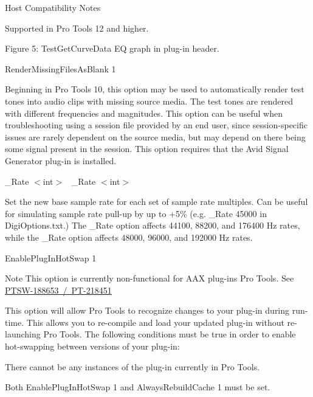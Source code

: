 \begin{DoxyItemize}
\begin{DoxyRefDesc}{Host Compatibility Notes}
\item[\mbox{\hyperlink{a00786__compatibility_notes000017}{Host Compatibility Notes}}]Supported in Pro Tools 12 and higher.\end{DoxyRefDesc}


  Figure 5\+: Test\+Get\+Curve\+Data EQ graph in plug-\/in header.


\item  {\ttfamily Render\+Missing\+Files\+As\+Blank 1}

Beginning in Pro Tools 10, this option may be used to automatically render test tones into audio clips with missing source media. The test tones are rendered with different frequencies and magnitudes. This option can be useful when troubleshooting using a session file provided by an end user, since session-\/specific issues are rarely dependent on the source media, but may depend on there being some signal present in the session. This option requires that the Avid Signal Generator plug-\/in is installed.


\item  {\+\_\+\+Rate $<$int$>$}~\newline
 {\+\_\+\+Rate $<$int$>$}

Set the new base sample rate for each set of sample rate multiples. Can be useful for simulating sample rate pull-\/up by up to +5\% (e.\+g. {\+\_\+\+Rate 45000} in Digi\+Options.\+txt.) The {\+\_\+\+Rate} option affects 44100, 88200, and 176400 Hz rates, while the {\+\_\+\+Rate} option affects 48000, 96000, and 192000 Hz rates.


\item  {\ttfamily Enable\+Plug\+In\+Hot\+Swap 1}

\begin{DoxyNote}{Note}
This option is currently non-\/functional for A\+AX plug-\/ins Pro Tools. See \mbox{\hyperlink{a00846_PTSW-188653}{P\+T\+S\+W-\/188653 / P\+T-\/218451}}
\end{DoxyNote}
This option will allow Pro Tools to recognize changes to your plug-\/in during run-\/time. This allows you to re-\/compile and load your updated plug-\/in without re-\/launching Pro Tools. The following conditions must be true in order to enable hot-\/swapping between versions of your plug-\/in\+: 
\begin{DoxyItemize}
\item There cannot be any instances of the plug-\/in currently in Pro Tools. 
\item Both {\ttfamily Enable\+Plug\+In\+Hot\+Swap 1} and {\ttfamily Always\+Rebuild\+Cache 1} must be set. 
\end{DoxyItemize}



\end{DoxyItemize}

